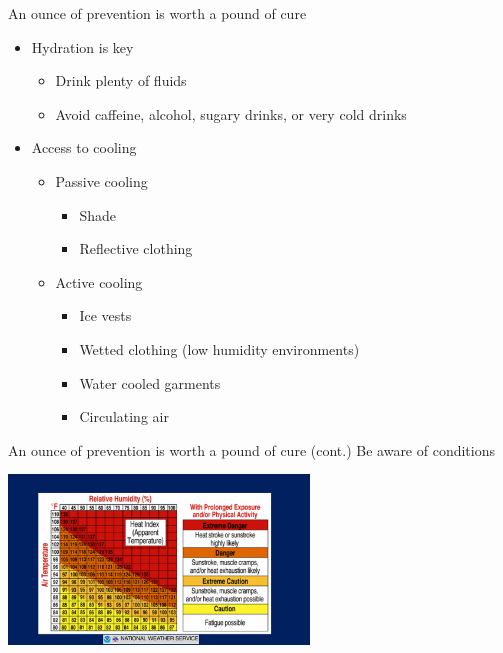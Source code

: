 \documentclass[aspectratio=169,notes]{beamer}
\begin{document}
\begin{frame}{An ounce of prevention is worth a pound of cure}
    \begin{itemize}
        \item Hydration is key
        \begin{itemize}
            \item Drink plenty of fluids
            \item Avoid caffeine, alcohol, sugary drinks, or very cold drinks
        \end{itemize}
        \item Access to cooling
        \begin{itemize}
            \item Passive cooling
            \begin{itemize}
                \item Shade
                \item Reflective clothing
            \end{itemize}
            \item Active cooling
            \begin{itemize}
                \item Ice vests
                \item Wetted clothing (low humidity environments)
                \item Water cooled garments
                \item Circulating air
            \end{itemize}
        \end{itemize}
    \end{itemize}
\end{frame}
\begin{frame}{An ounce of prevention is worth a pound of cure (cont.)}
    Be aware of conditions

    \centering
    \includegraphics[width=0.6\textwidth,height=0.5\textheight,keepaspectratio]{Heat Index NWS.png}
\end{frame}
\end{document}
